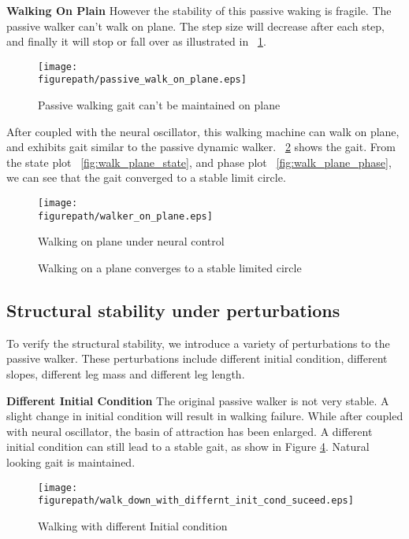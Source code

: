 \textbf{Walking On Plain}
However the stability of this passive waking is fragile. The passive walker can't walk on plane. 
The step size will decrease after each step, and finally it will stop or fall over as illustrated in \figurename ~\ref{fig:pass_waling_on_plane}.
\begin{figure}[!h]
\centering
\texttt{[image: \\figurepath/passive\_walk\_on\_plane.eps]}
\caption{Passive walking gait can't be maintained on plane}
\label{fig:pass_waling_on_plane}
\end{figure}

After coupled with the neural oscillator, this walking machine can walk on plane, and exhibits gait similar to the passive dynamic walker. 
\figurename ~\ref{fig:walk_plane} shows the gait. 
From the state plot \figurename ~\ref{fig:walk_plane_state}, and phase plot \figurename ~\ref{fig:walk_plane_phase}, we can see that the gait converged to a stable limit circle.


\begin{figure}[!h]
\centering
\texttt{[image: \\figurepath/walker\_on\_plane.eps]}
\caption{Walking on plane under neural control}
\label{fig:walk_plane}
\end{figure}


\begin{figure}[!h]
\centerline{
\hfill
{}
}
\caption{
Walking on a plane converges to a stable limited circle
}
\label{fig:walk_on_plane}
\end{figure}

\subsection{Structural stability under perturbations}
To verify the structural stability, we introduce a variety of perturbations to the passive walker. 
These perturbations include different initial condition, different slopes, different leg mass and different leg length.

\textbf{Different Initial Condition}
The original passive walker is not very stable. 
A slight change in initial condition will result in walking failure. 
While after coupled with neural oscillator, the basin of attraction has been enlarged. 
A different initial condition can still lead to a stable gait, as show in Figure \ref{fig:diff_init}. 
Natural looking gait is maintained.
\begin{figure}[h]
\centering
\texttt{[image: \\figurepath/walk\_down\_with\_differnt\_init\_cond\_suceed.eps]}
\caption
{
Walking with different Initial condition
}
\label{fig:diff_init}
\end{figure}
 

